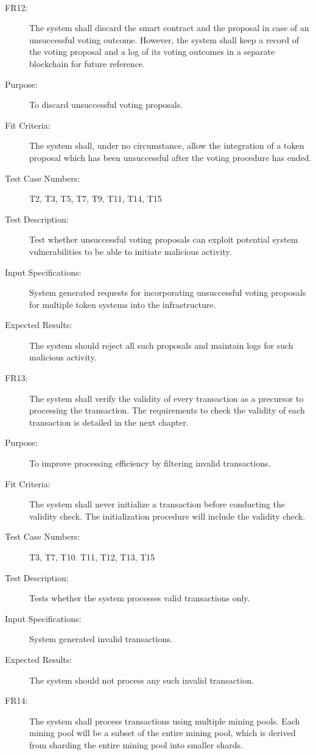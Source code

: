 \documentclass[a4paper,twoside,phd]{BYUPhys}
\begin{document}
\begin{description}
\\
\item[FR12:] The system shall discard the smart contract and the proposal in case of an unsuccessful voting outcome. However, the system shall keep a record of the voting proposal and a log of its voting outcomes in a separate blockchain for future reference.
\item[Purpose:] To discard unsuccessful voting proposals.
\item[Fit Criteria:] The system shall, under no circumstance, allow the integration of a token proposal which has been unsuccessful after the voting procedure has ended.
\item[Test Case Numbers:] T2, T3, T5, T7, T9, T11, T14, T15
\item[Test Description:] Test whether unsuccessful voting proposals can exploit potential system vulnerabilities to be able to initiate malicious activity.
\item[Input Specifications:] System generated requests for incorporating unsuccessful voting proposals for multiple token systems into the infrastructure.
\item[Expected Results:] The system should reject all such proposals and maintain logs for such malicious activity.
\\
\item[FR13:] The system shall verify the validity of every transaction as a precursor to processing the transaction. The requirements to check the validity of each transaction is detailed in the next chapter.
\item[Purpose:] To improve processing efficiency by filtering invalid transactions.
\item[Fit Criteria:] The system shall never initialize a transaction before conducting the validity check. The initialization procedure will include the validity check. 
\item[Test Case Numbers:] T3, T7, T10. T11, T12, T13, T15
\item[Test Description:] Tests whether the system processes valid transactions only.
\item[Input Specifications:] System generated invalid transactions.
\item[Expected Results:] The system should not process any such invalid transaction.
\\
\item[FR14:] The system shall process transactions using multiple mining pools. Each mining pool will be a subset of the entire mining pool, which is derived from sharding the entire mining pool into smaller shards.

\end{description}
\end{document}
